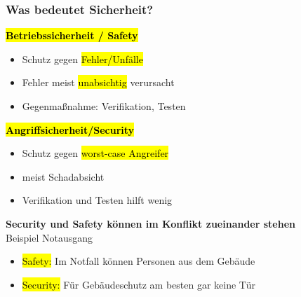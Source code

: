 \documentclass[a4paper, 10pt]{article}
\begin{document}
\subsubsection{Was bedeutet Sicherheit?}
\textbf{\hl{Betriebssicherheit / Safety}} 
\begin{itemize}
    \item Schutz gegen \hl{Fehler/Unfälle}
    \item Fehler meist \hl{unabsichtig} verursacht
    \item Gegenmaßnahme: Verifikation, Testen 
\end{itemize}
\textbf{\hl{Angriffsicherheit/Security}}
\begin{itemize}
    \item Schutz gegen \hl{worst-case Angreifer}
    \item meist Schadabsicht
    \item Verifikation und Testen hilft wenig
\end{itemize}
\textbf{Security und Safety können im Konflikt zueinander stehen}\\
Beispiel Notausgang 
\begin{itemize}
    \item \hl{Safety:} Im Notfall können Personen aus dem Gebäude 
    \item \hl{Security:} Für Gebäudeschutz am besten gar keine Tür
\end{itemize}
\end{document}
